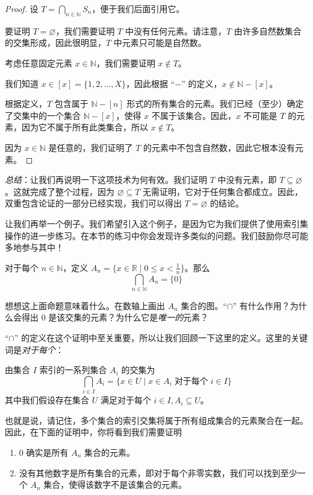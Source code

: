 \begin{proof}
    设 $T = \bigcap_{n \in \mathbb{N}}S_n$，便于我们后面引用它。

    要证明 $T = \varnothing$，我们需要证明 $T$ 中没有任何元素。请注意，$T$ 由许多自然数集合的交集形成，因此很明显，$T$ 中元素只可能是自然数。

    考虑任意固定元素 $x \in \mathbb{N}$，我们需要证明 $x \notin T$。

    我们知道 $x \in [x] = \{1,2,\dots, X\}$，因此根据 ``$-$'' 的定义，$x \notin \mathbb{N}-[x]$。

    根据定义，$T$ 包含属于 $\mathbb{N} - [n]$ 形式的所有集合的元素。我们已经（至少）确定了交集中的一个集合 $\mathbb{N} - [x]$，使得 $x$ 不属于该集合。因此，$x$ 不可能是 $T$ 的元素，因为它不属于所有此类集合，所以 $x \notin T$。

    因为 $x \in \mathbb{N}$ 是任意的，我们证明了 $T$ 的元素中不包含自然数，因此它根本没有元素。
\end{proof}

\emph{总结}：让我们再说明一下这项技术为何有效。我们证明 $T$ 中没有元素，即 $T \subseteq \varnothing$。这就完成了整个过程，因为 $\varnothing \subseteq T$ 无需证明，它对于任何集合都成立。因此，双重包含论证的一部分已经实现，我们可以得出 $T = \varnothing$ 的结论。

让我们再举一个例子。我们希望引入这个例子，是因为它为我们提供了使用索引集操作的进一步练习。在本节的练习中你会发现许多类似的问题。我们鼓励你尽可能多地参与其中！

\begin{proposition}
    对于每个 $n \in \mathbb{N}$，定义 $A_n = \{x \in \mathbb{R} \mid 0 \le x < \frac{1}{n}\}$。那么
    \[\bigcap_{n \in \mathbb{N}}A_n = \{0\}\]
\end{proposition}

想想这上面命题意味着什么。在数轴上画出 $A_n$ 集合的图。``$\cap$'' 有什么作用？为什么会得出 $0$ 是该交集的元素？为什么它是\emph{唯一的}元素？

``$\cap$'' 的定义在这个证明中至关重要，所以让我们回顾一下这里的定义。这里的关键词是\emph{对于每个}：

\begin{definition}
    由集合 $I$ 索引的一系列集合 $A_i$ 的交集为
    \[\bigcap_{i \in I} A_i = \{x \in U \mid x \in A_i \;\text{对于每个}\; i \in I\}\]
    其中我们假设存在集合 $U$ 满足对于每个 $i \in I, A_i \subseteq U$。
\end{definition}

也就是说，请记住，多个集合的索引交集将属于所有组成集合的元素聚合在一起。因此，在下面的证明中，你将看到我们需要证明
\begin{enumerate}[label=(\arabic*)]
    \item $0$ 确实是所有 $A_n$ 集合的元素。
    \item 没有其他数字是所有集合的元素，即对于每个非零实数，我们可以找到至少一个 $A_n$ 集合，使得该数字不是该集合的元素。
\end{enumerate} 

